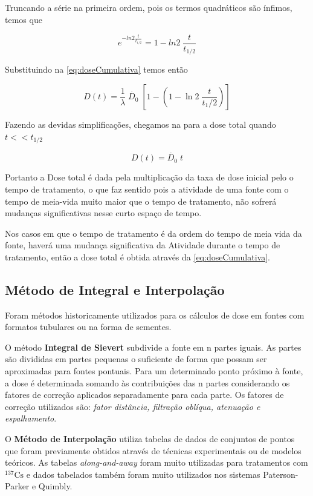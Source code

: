 \documentclass[11pt,a4paper]{article}
\begin{document}
			Truncando a série na primeira ordem, pois os termos quadráticos são ínfimos, temos que

			$$ e^{-ln 2 \frac{t}{t_{1/2}}} = 1 - ln 2 \; \frac{t}{t_{1/2}}$$

			Substituindo na   \ref{eq:doseCumulativa} temos então

			$$D(t) = \frac{1}{\lambda} \; \dot{D_0} \; \left[1 - \left(1 - \ln 2 \; \frac{t}{t_1/2}\right)\right]$$

			Fazendo as devidas simplificações, chegamos na   para a dose total quando $t << t_{1/2}$

			\begin{equation}
				D(t) = \dot{D_0} \; t
				\label{eq:AproximacaoImplantesTemporarios}
			\end{equation}

			Portanto a Dose total é dada pela multiplicação da taxa de dose inicial pelo o tempo de tratamento, o que faz sentido pois a atividade de uma fonte com o tempo de meia-vida muito maior que o tempo de tratamento, não sofrerá mudanças significativas nesse curto espaço de tempo.


			Nos casos em que o tempo de tratamento é da ordem do tempo de meia vida da fonte, haverá uma mudança significativa da Atividade durante o tempo de tratamento, então a dose total é obtida através da   \ref{eq:doseCumulativa}.

		\subsection{Método de Integral e Interpolação}

			Foram métodos historicamente utilizados para os cálculos de dose em fontes com formatos tubulares ou na forma de sementes.

			O método \textbf{\textcolor{CarnationPink}{Integral de Sievert}} subdivide a fonte em n partes iguais. As partes são divididas em partes pequenas o suficiente de forma que possam ser aproximadas para fontes pontuais. Para um determinado ponto próximo à fonte, a dose é determinada somando às contribuições das n partes considerando os fatores de correção aplicados separadamente para cada parte. Os fatores de correção utilizados são: \textit{fator distância, filtração oblíqua, atenuação e espalhamento}.

			O \textbf{\textcolor{CarnationPink}{Método de Interpolação}} utiliza tabelas de dados de conjuntos de pontos que foram previamente obtidos através de técnicas experimentais ou de modelos teóricos. As tabelas \textit{\textcolor{CarnationPink}{along-and-away}} foram muito utilizadas para tratamentos com $\mathrm{{}^{137}Cs}$ e dados tabelados também foram muito utilizados nos sistemas Paterson-Parker e Quimbly.
\end{document}
